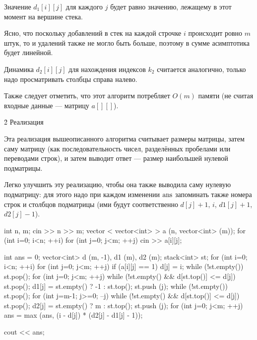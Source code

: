 Значение $d_1[i][j]$ для каждого $j$ будет равно значению, лежащему в этот момент на вершине стека.

Ясно, что поскольку добавлений в стек на каждой строчке $i$ происходит ровно $m$ штук, то и удалений также не могло быть больше, поэтому в сумме асимптотика будет линейной.

Динамика $d_2[i][j]$ для нахождения индексов $k_2$ считается аналогично, только надо просматривать столбцы справа налево.

Также следует отметить, что этот алгоритм потребляет $O(m)$ памяти (не считая входные данные --- матрицу $a[][]$).


\h2{ Реализация }

Эта реализация вышеописанного алгоритма считывает размеры матрицы, затем саму матрицу (как последовательность чисел, разделённых пробелами или переводами строк), и затем выводит ответ --- размер наибольшей нулевой подматрицы.

Легко улучшить эту реализацию, чтобы она также выводила саму нулевую подматрицу: для этого надо при каждом изменении $\rm ans$ запоминать также номера строк и столбцов подматрицы (ими будут соответственно $d[j]+1$, $i$, $d1[j]+1$, $d2[j]-1$).

\code
int n, m;
cin >> n >> m;
vector < vector<int> > a (n, vector<int> (m));
for (int i=0; i<n; ++i)
	for (int j=0; j<m; ++j)
		cin >> a[i][j];

int ans = 0;
vector<int> d (m, -1), d1 (m), d2 (m);
stack<int> st;
for (int i=0; i<n; ++i) {
	for (int j=0; j<m; ++j)
		if (a[i][j] == 1)
			d[j] = i;
	while (!st.empty()) st.pop();
	for (int j=0; j<m; ++j) {
		while (!st.empty() && d[st.top()] <= d[j])  st.pop();
		d1[j] = st.empty() ? -1 : st.top();
		st.push (j);
	}
	while (!st.empty()) st.pop();
	for (int j=m-1; j>=0; --j) {
		while (!st.empty() && d[st.top()] <= d[j])  st.pop();
		d2[j] = st.empty() ? m : st.top();
		st.push (j);
	}
	for (int j=0; j<m; ++j)
		ans = max (ans, (i - d[j]) * (d2[j] - d1[j] - 1));
}

cout << ans;
\endcode








